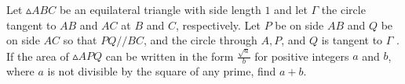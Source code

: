 Let  $\vartriangle ABC$ be an equilateral triangle with side length $1$ and let $\Gamma$ the circle tangent to $AB$ and $AC$ at $B$ and $C$, respectively. Let $P$ be on side $AB$ and $Q$ be on side $AC$ so that $PQ // BC$, and the circle through $A, P$, and $Q$ is tangent to  $\Gamma$ . If the area of $\vartriangle APQ$ can be written in the form $\frac{\sqrt{a}}{b}$ for positive integers $a$ and $b$, where $a$ is not divisible by the square of any prime, find $a + b$.